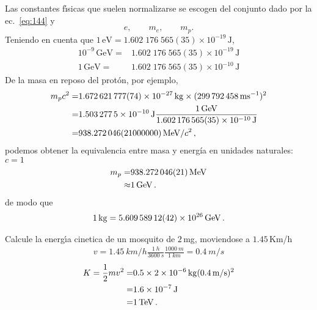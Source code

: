 Las constantes f\'\i sicas que suelen normalizarse se escogen del conjunto dado por la ec.~\eqref{eq:144} y
\begin{equation}
  \label{eq:145}
  e,\qquad m_e,\qquad m_p.
\end{equation}
Teniendo en cuenta que $1\,\text{eV}=1.602\;176\;565(35)\times10^{-19}\,\text{J}$,
\begin{align}
  10^{-9}\,\text{GeV}=&1.602\;176\;565(35)\times10^{-19}\,\text{J}\nonumber\\
  1\,\text{GeV}=&1.602\;176\;565(35)\times10^{-10}\,\text{J}
\end{align}
De la masa en reposo del protón, por ejemplo, 
\begin{align*}
  m_pc^2=&\SI{1.672621777 +- 0.000000074E-27}{kg}\times (\SI{299792458}{ms^{-1}})^2\nonumber\\
  =&\SI{1.5032775e-10}{J}\frac{\SI{1}{GeV}}{\SI{1.602176565 +- .000000035E-10}{J}}\nonumber\\
  =&\SI{938.272046+-21}{MeV}/c^2\,,
\end{align*}
podemos obtener la equivalencia entre masa y energía en unidades naturales: $c=1$
\begin{align}
m_p=&\SI{938.272046+-0.000021}{MeV}\nonumber\\
  \approx& \SI{1}{GeV}\,.
\end{align}
de modo que
\begin{align}
  \SI{1}{kg}=\SI{5.60958912 +- 0.00000042E26}{GeV}\,.
\end{align}

\begin{example}
  Calcule la energ\'\i a cinetica de un mosquito de $2\,$mg, moviendose a $1.45\,$Km/h
  \begin{align}
    v= \SI{1.45}{km/h}\frac{\SI{1}{h}}{\SI{3600}{s}}\frac{\SI{1000}{m}}{\SI{1}{km}}=\SI{0.4}{m/s}  
\end{align}
\begin{align}
  K=\frac{1}{2}mv^2=&0.5\times \SI{2E-6}{kg}(\SI{0.4}{m/s})^2 \nonumber\\
                   =&\SI{1.6E-7}{J}\nonumber\\
                   =&\SI{1}{TeV}\,.
\end{align}

\end{example}

